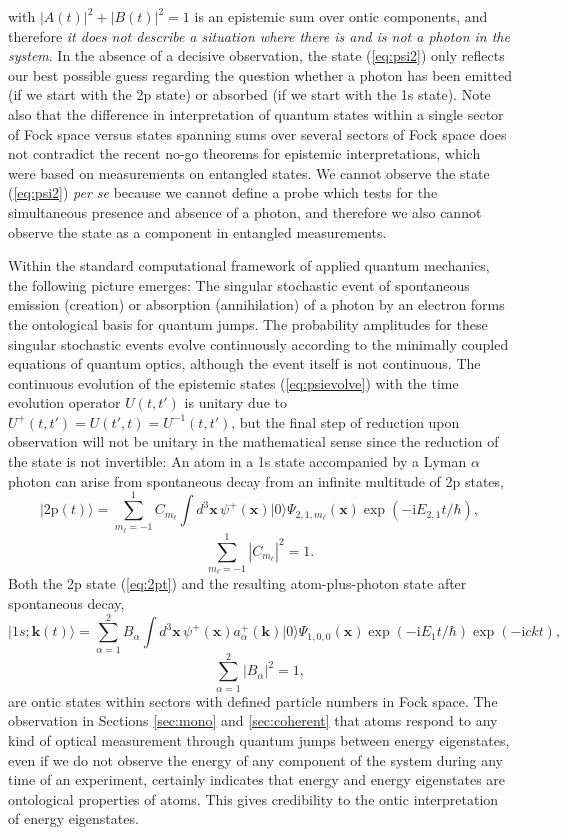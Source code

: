 \documentclass[final,3p,12pt]{elsarticle3}
\begin{document}
with $|A(t)|^2+|B(t)|^2=1$ is an epistemic sum over ontic components, and therefore
{\it it does not describe a situation where there is and is not a photon in the system}.
In the absence of a decisive observation, the state (\ref{eq:psi2}) only reflects 
our best possible guess regarding the question whether a photon has been emitted
(if we start with the 2p state) or absorbed (if we start with the 1s state). Note 
also that the difference in interpretation of quantum states within a single sector
of Fock space versus states spanning sums over several sectors of Fock space does not 
contradict the recent no-go theorems for epistemic interpretations, which were based
on measurements on entangled states. We cannot observe the 
state (\ref{eq:psi2}) {\it per se} because we cannot define a probe which
tests for the simultaneous presence and absence of a photon, and therefore
we also cannot observe the state as a component in entangled measurements. 

Within the standard computational framework of applied quantum mechanics, 
the following picture emerges:
The singular stochastic event of spontaneous emission (creation) or 
absorption (annihilation) of a photon by an electron forms the ontological
basis for quantum jumps. The probability amplitudes for these singular
stochastic events evolve continuously according to
the minimally coupled equations of quantum optics, although the event
itself is not continuous. The continuous evolution of the epistemic 
states (\ref{eq:psievolve}) with the time evolution operator
$U(t,t')$ is unitary due to $U^+(t,t')=U(t',t)=U^{-1}(t,t')$, 
but the final step of reduction upon observation
will not be unitary in the mathematical sense since the reduction of the
state is not invertible: An atom in a 1s state accompanied by a 
Lyman $\alpha$ photon can arise from spontaneous decay from an infinite 
multitude of 2p states,
\begin{equation}
\bm{|}2\mathrm{p}(t)\bm{\rangle}=\sum_{m_\ell=-1}^1C_{m_\ell}
\int\!d^3\bm{x}\,\psi^+(\bm{x})\bm{|}0\bm{\rangle}
\Psi_{2,1,m_\ell}(\bm{x})
\label{eq:2pt}
\exp(-\mathrm{i}E_{2,1}t/\hbar),
\end{equation}
\[
\sum_{m_\ell=-1}^1\left|C_{m_\ell}\right|^2=1.
\]
Both the 2p state (\ref{eq:2pt}) and the resulting atom-plus-photon state
after spontaneous decay,
\begin{equation}
\bm{|}1s;\bm{k}(t)\bm{\rangle}=\sum_{\alpha=1}^2B_{\alpha}
\int\!d^3\bm{x}\,\psi^+(\bm{x})a^+_{\alpha}(\bm{k})\bm{|}0\bm{\rangle}
\Psi_{1,0,0}(\bm{x})
\label{eq:1sgammat}
\exp(-\mathrm{i}E_{1}t/\hbar)\exp(-\mathrm{i}ckt),
\end{equation}
\[
\sum_{\alpha=1}^2\left|B_{\alpha}\right|^2=1,
\]
are ontic states within sectors with defined particle numbers in Fock space. 
The observation in Sections \ref{sec:mono} and \ref{sec:coherent} 
that atoms respond to any kind of optical measurement
through quantum jumps between energy eigenstates, even if we do not observe the energy
of any component of the system during any time of an experiment, certainly indicates
that energy and energy eigenstates are ontological properties of atoms. This
gives credibility to the ontic interpretation of energy eigenstates.
\end{document}
